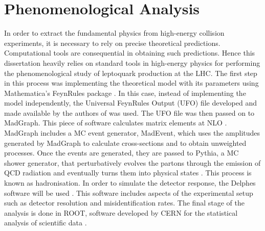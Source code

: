 \chapter{Phenomenological Analysis}
\label{ch:pheno-analysis}
\label{ch:chapter4}

In order to extract the fundamental physics from high-energy collision experiments, it is necessary to rely on precise theoretical predictions. Computational tools are consequential in obtaining such predictions. Hence this dissertation heavily relies on standard tools in high-energy physics for performing the phenomenological study of leptoquark production at the LHC. The first step in this process was implementing the theoretical model with its parameters using Mathematica's FeynRules package \cite{alloul_FeynRules_2014}. In this case, instead of implementing the model independently, the Universal FeynRules Output (UFO) file developed and made available by the authors of \cite{baker_high_2019} was used. The UFO file was then passed on to MadGraph. This piece of software calculates matrix elements at NLO \cite{automated-alwall-2014, MadGraph5}. MadGraph includes a MC event generator, MadEvent, which uses the amplitudes generated by MadGraph to calculate cross-sections and to obtain unweighted processes. Once the events are generated, they are passed to Pythia, a MC shower generator, that perturbatively evolves the partons through the emission of QCD radiation and eventually turns them into physical states \cite{sjostrand_pythia_2006}. This process is known as hadronisation. In order to simulate the detector response, the Delphes software will be used \cite{de_favereau_delphes_2014}. This software includes aspects of the experimental setup such as detector resolution and misidentification rates. The final stage of the analysis is done in ROOT, software developed by CERN for the statistical analysis of scientific data \cite{antcheva-ROOT-2009}. 

